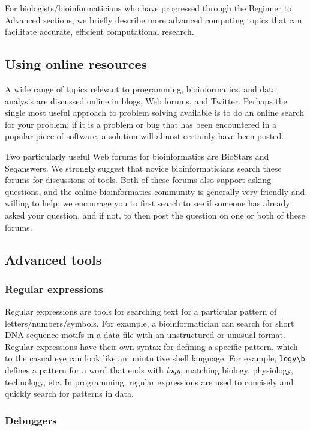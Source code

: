 \documentclass[ChapterTOCs,krantz2]{krantz} %
\begin{document}
For biologists/bioinformaticians who have progressed through the Beginner
to Advanced sections, we briefly describe more advanced computing topics 
that can facilitate accurate, efficient computational research.

\subsection{Using online resources}

A wide range of topics relevant to programming, bioinformatics, and
data analysis are discussed online in blogs, Web forums, and Twitter.
Perhaps the single most useful approach to problem solving available
is to do an online search for your problem; if it is a problem or bug
that has been encountered in a popular piece of software, a solution will
almost certainly have been posted.

Two particularly useful Web forums for bioinformatics are BioStars and
Seqanswers.  We strongly suggest that novice bioinformaticians
search these forums for discussions of tools.  Both of these forums
also support asking questions, and the online bioinformatics community
is generally very friendly and willing to help; we encourage you to
first search to see if someone has already asked your question, and if
not, to then post the question on one or both of these forums.

\subsection{Advanced tools}

\subsubsection{Regular expressions}

Regular expressions are tools for
searching text for a particular pattern of letters/numbers/symbols.  For
example, a bioinformatician can search for short DNA sequence motifs in 
a data file with an unstructured or unusual format.  Regular expressions have their own
syntax for defining a specific pattern, which to the casual eye can look like
an unintuitive shell language. For example, \texttt{logy\textbackslash{}b} defines a pattern for a word
that ends with \emph{logy}, matching biology, physiology, technology, etc.
In programming, regular expressions are
used to concisely and quickly search for patterns in data.

\subsubsection{Debuggers}
\end{document}
